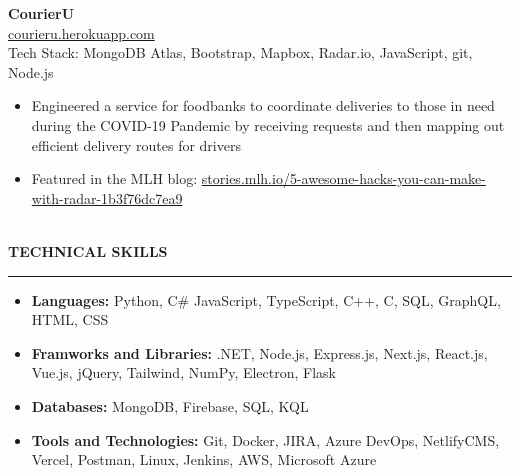 \documentclass[11pt]{article}
\def \prim {MidnightBlue}
\def \link {\faLink}
\begin{document}
\textbf{CourierU} \hfill\\
\link\space\href{https://courieru.herokuapp.com/index.html}{courieru.herokuapp.com} \\
Tech Stack: MongoDB Atlas, Bootstrap, Mapbox, Radar.io, JavaScript, git, Node.js
\color{Black}
\begin{itemize}[noitemsep, topsep=2pt, parsep=2pt]
\item
Engineered a service for foodbanks to coordinate deliveries to those in need during the COVID-19 Pandemic by
receiving requests and then mapping out efficient delivery routes for drivers
\item
Featured in the MLH blog: \href{https://stories.mlh.io/5-awesome-hacks-you-can-make-with-radar-1b3f76dc7ea9}{stories.mlh.io/5-awesome-hacks-you-can-make-with-radar-1b3f76dc7ea9} 
\end{itemize}
\color{\prim}
\noindent
\large \\
\space\textbf{TECHNICAL SKILLS}
\normalsize
\vspace{1.2pt}
\hrule
\color{Black}
\begin{itemize}[noitemsep, topsep=2pt, parsep=2pt]
\item
\textbf{Languages:} Python, C\# JavaScript, TypeScript, C++, C, SQL, GraphQL, HTML, CSS
\item
\textbf{Framworks and Libraries:} .NET, Node.js, Express.js, Next.js, React.js, Vue.js, jQuery, Tailwind, NumPy, Electron, Flask
\item
\textbf{Databases:} MongoDB, Firebase, SQL, KQL
\item
\textbf{Tools and Technologies:} Git, Docker, JIRA, Azure DevOps,  NetlifyCMS, Vercel, Postman, Linux, Jenkins, AWS, Microsoft Azure
\end{itemize}
\end{document}
